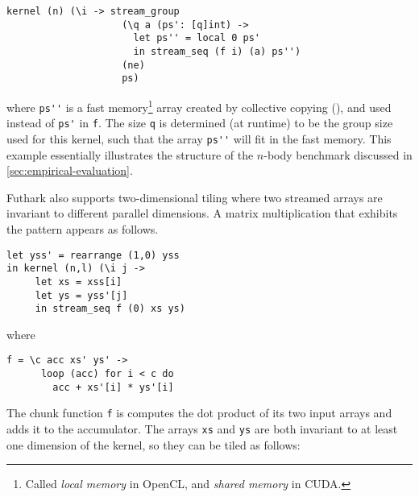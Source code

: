 \begin{lstlisting}[xleftmargin=0.5cm]
kernel (n) (\i -> stream_group
                    (\q a (ps': [q]int) ->
                      let ps'' = local 0 ps'
                      in stream_seq (f i) (a) ps'')
                    (ne)
                    ps)
\end{lstlisting}

\noindent where \lstinline{ps''} is a fast memory\footnote{Called
  \textit{local memory} in OpenCL, and \textit{shared memory} in
  CUDA.} array created by collective copying (), and used
instead of \lstinline{ps'} in \lstinline{f}.  The size \lstinline{q}
is determined (at runtime) to be the group size used for this kernel,
such that the array \lstinline{ps''} will fit in the fast memory.
This example essentially illustrates the structure of the $n$-body
benchmark discussed in \cref{sec:empirical-evaluation}.

Futhark also supports two-dimensional tiling where two streamed arrays
are invariant to different parallel dimensions.  A matrix
multiplication that exhibits the pattern appears as follows.

\begin{lstlisting}[xleftmargin=0.5cm]
let yss' = rearrange (1,0) yss
in kernel (n,l) (\i j ->
     let xs = xss[i]
     let ys = yss'[j]
     in stream_seq f (0) xs ys)
\end{lstlisting}
\begin{minipage}[t]{0.1\linewidth}
  \begin{flushright}
    where
  \end{flushright}
\end{minipage}
\begin{minipage}[t]{0.8\linewidth}
\lstinline{f = \c acc xs' ys' ->}\\
\lstinline{      loop (acc) for i < c do}\\
\lstinline{        acc + xs'[i] * ys'[i]}
\end{minipage}
\vspace{1em}

The chunk function \lstinline{f} is computes the dot product of its
two input arrays and adds it to the accumulator.  The arrays
\lstinline{xs} and \lstinline{ys} are both invariant to at least one
dimension of the kernel, so they can be tiled as follows:

